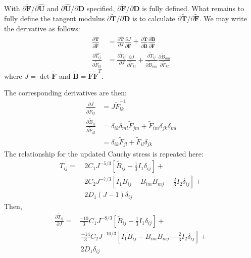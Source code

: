 With $\partial \tilde{\bm F}/\partial \hat{\bm U}$ and $\partial \hat{\bm U}/\partial {\bm D}$ specified, $\partial \tilde{\bm F}/\partial {\bm D}$ is fully defined. What remains to fully define the tangent modulus $\partial \tilde{\bm T}/\partial {\bm D}$ is to calculate $\partial \tilde{\bm T}/\partial \tilde {\bm F}$. We may write the derivative as follows:
\begin{align}
\frac{\partial \tilde{\bm T}}{\partial \tilde{\bm F}} &= \frac{\partial \tilde{\bm T}}{\partial J}\frac{\partial J}{\partial \tilde {\bm F}} + \frac{\partial \tilde{\bm T}}{\partial {\tilde{\bm {B}}}}\frac{\partial {\tilde{\bm {B}}}}{\partial \tilde {\bm F}} \\
\frac{\partial \hat{T_{ij}}}{\partial \tilde{F}_{kl}} &= \frac{\partial \tilde{T}_{ij}}{\partial J}\frac{\partial J}{\partial \tilde{F}_{kl}} + \frac{\partial \tilde{T}_{ij}}{\partial \tilde{B}_{mn}}\frac{\partial \tilde{B}_{mn}}{\partial \tilde{F}_{kl}}
\end{align}
where $J = \det\tilde{\bm{F}}$ and $\tilde{\bm{B}} = \tilde{\bm{F}}\tilde{\bm{F}}^T$.

The corresponding derivatives are then:
\begin{align}
\frac{\partial J}{\partial {\tilde{F}}_{kl}} &= {J}{\tilde{F}}^{-1}_{lk} \\
\frac{\partial \tilde{B}_{ij}}{\partial {\tilde{F}}_{kl}} &= \delta_{ik}\delta_{ml}{\tilde{F}}_{jm} + {\tilde{F}}_{im}\delta_{jk}\delta_{ml} \\
 &=  \delta_{ik}{\tilde{F}}_{jl} + {\tilde{F}}_{il}\delta_{jk}
\end{align}
The relationship for the updated Cauchy stress is repeated here:
\begin{equation}
\begin{aligned}
T_{ij} = &\ 2C_1J^{-5/3}\left[\tilde{B}_{ij} - \frac{1}{3}I_1\delta_{ij}\right] + \\ 
&\ 2C_2J^{-7/3}\left[I_1\tilde{B}_{ij} - \tilde{B}_{im}\tilde{B}_{mj} - \frac{2}{3}I_2\delta_{ij}\right] + \\
&\ 2D_1(J-1)\delta_{ij}
\end{aligned}
\end{equation}
Then,
\begin{equation}
\begin{aligned}
\frac{\partial \tilde{T}_{ij}}{\partial J} = &\frac{-10}{3}C_1J^{-8/3}\left[\tilde{B}_{ij} - \frac{1}{3}I_1\delta_{ij}\right] + \\
&\ \frac{-14}{3}C_2J^{-10/3}\left[I_1\tilde{B}_{ij} - \tilde{B}_{im}\tilde{B}_{mj} - \frac{2}{3}I_2\delta_{ij}\right] + \\ &\ 2D_1\delta_{ij}
\end{aligned}
\end{equation}

